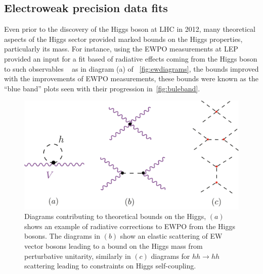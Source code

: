\subsection{Electroweak precision data fits }
Even prior to the discovery of the Higgs boson at LHC in 2012, many theoretical aspects of the Higgs sector provided marked bounds on the Higgs properties, particularly its mass. For instance, using the EWPO measurements at LEP provided an input for a fit based of radiative effects coming from the Higgs boson to such observables ~\cite{ALEPH:2005ab} as in diagram (a) of ~\autoref{fig:ewdiagrams}, the bounds improved with the improvements of EWPO measurements, these bounds were known as the ``blue band'' plots seen with their progression in~\autoref{fig:buleband}.
\begin{figure}[t!]
	\begin{center}
		\includegraphics[width=.7 \linewidth]{figures/theoretical_const}
		\caption{Diagrams contributing to theoretical bounds on the Higgs, $(a) $ shows an example of radiative corrections to EWPO from the Higgs bosons. The diagrams in $(b)$ show an elastic scattering of EW vector bosons leading to a bound on the Higgs mass from perturbative unitarity, similarly in $(c)$ diagrams for $hh \to hh$ scattering leading to constraints on Higgs self-coupling.}
		\label{fig:ewdiagrams}
	\end{center}
\end{figure}
